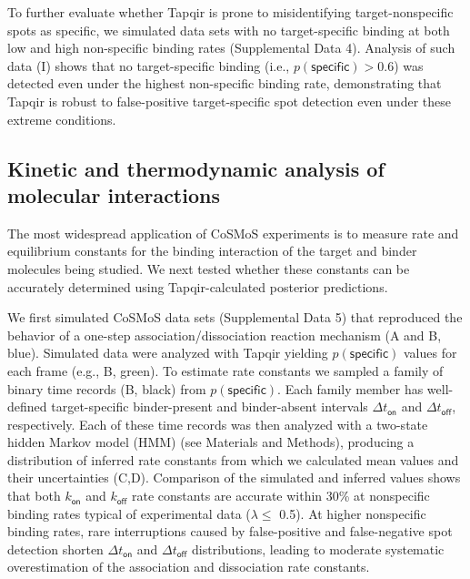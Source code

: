 To further evaluate whether Tapqir is prone to misidentifying target-nonspecific spots as specific, we  simulated data sets with no target-specific binding at both low and high non-specific binding rates (Supplemental Data 4). Analysis of such data (I) shows that no target-specific binding (i.e., $p(\mathsf{specific}) > 0.6$) was detected even under the highest non-specific binding rate, demonstrating that Tapqir is robust to false-positive target-specific spot detection even under these extreme conditions. 



\subsection{Kinetic and thermodynamic analysis of molecular interactions}

The most widespread application of CoSMoS experiments is to measure rate and equilibrium constants for the binding interaction of the target and binder molecules being studied.  We next tested whether these constants can be accurately determined using Tapqir-calculated posterior predictions. 

We first simulated CoSMoS data sets (Supplemental Data 5) that reproduced the behavior of a one-step association/dissociation reaction mechanism (A and B, blue). Simulated data were analyzed with Tapqir yielding $p(\mathsf{specific})$ values for each frame (e.g., B, green). To estimate rate constants we sampled a family of binary time records (B, black) from $p(\mathsf{specific})$. Each family member has well-defined target-specific binder-present and binder-absent intervals $\Delta t_\mathsf{on}$ and $\Delta t_\mathsf{off}$, respectively. Each of these time records was then analyzed with a two-state hidden Markov model (HMM) (see Materials and Methods), producing a distribution of inferred rate constants from which we calculated mean values and their uncertainties (C,D). Comparison of the simulated and inferred values shows that both $k_\mathsf{on}$ and $k_\mathsf{off}$ rate constants are accurate within 30\% at nonspecific binding rates typical of experimental data ($\lambda \leq$ 0.5). At higher nonspecific binding rates, rare interruptions caused by false-positive and false-negative spot detection shorten $\Delta t_\mathsf{on}$ and $\Delta t_\mathsf{off}$ distributions, leading to moderate systematic overestimation of the association and dissociation rate constants.

